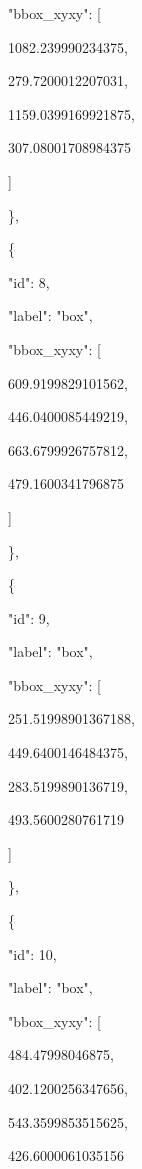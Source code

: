 \documentclass[10pt,a4paper]{article}
\begin{document}
      "bbox\_xyxy":\allowbreak{} [\par
        1082.239990234375,\allowbreak{}\par
        279.7200012207031,\allowbreak{}\par
        1159.0399169921875,\allowbreak{}\par
        307.08001708984375\par
      ]\par
    \},\allowbreak{}\par
    \{\par
      "id":\allowbreak{} 8,\allowbreak{}\par
      "label":\allowbreak{} "box",\allowbreak{}\par
      "bbox\_xyxy":\allowbreak{} [\par
        609.9199829101562,\allowbreak{}\par
        446.0400085449219,\allowbreak{}\par
        663.6799926757812,\allowbreak{}\par
        479.1600341796875\par
      ]\par
    \},\allowbreak{}\par
    \{\par
      "id":\allowbreak{} 9,\allowbreak{}\par
      "label":\allowbreak{} "box",\allowbreak{}\par
      "bbox\_xyxy":\allowbreak{} [\par
        251.51998901367188,\allowbreak{}\par
        449.6400146484375,\allowbreak{}\par
        283.5199890136719,\allowbreak{}\par
        493.5600280761719\par
      ]\par
    \},\allowbreak{}\par
    \{\par
      "id":\allowbreak{} 10,\allowbreak{}\par
      "label":\allowbreak{} "box",\allowbreak{}\par
      "bbox\_xyxy":\allowbreak{} [\par
        484.47998046875,\allowbreak{}\par
        402.1200256347656,\allowbreak{}\par
        543.3599853515625,\allowbreak{}\par
        426.6000061035156\par
\end{document}
